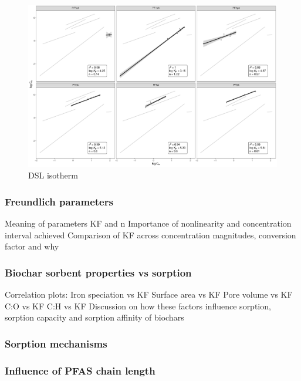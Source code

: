 \begin{figure}
    \centering
    \includegraphics[width=\textwidth]{R/figs/DSL_facet_isotherm.pdf}
    \caption{DSL isotherm}
    \label{fig:DSL_isotherm}
\end{figure}

\subsubsection{Freundlich parameters}
Meaning of parameters KF and n
Importance of nonlinearity and concentration interval achieved 
Comparison of KF across concentration magnitudes, conversion factor and why

\subsubsection{Biochar sorbent properties vs sorption}
Correlation plots:
    Iron speciation vs KF
    Surface area vs KF 
    Pore volume vs KF 
    C:O vs KF 
    C:H vs KF  
Discussion on how these factors influence sorption, sorption capacity and sorption affinity of biochars

\subsubsection{Sorption mechanisms}

\subsubsection{Influence of PFAS chain length}

